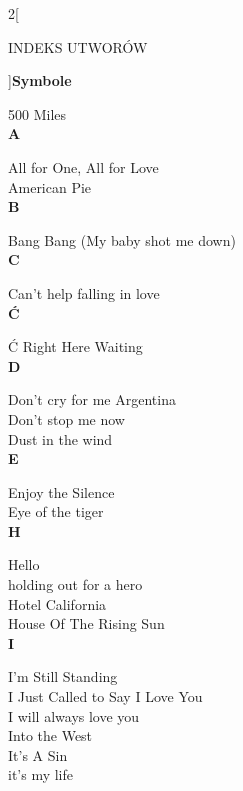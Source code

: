 \documentclass[a4paper]{report}
\begin{document}
\begin{multicols*}{2}[\begin{Huge}INDEKS UTWORÓW\end{Huge}\vspace{1cm}]{\Large\bfseries  Symbole  }\nopagebreak 

500 Miles  \\

\indexspace
{\Large\bfseries  A  }\nopagebreak 

All for One, All for Love  \\
American Pie  \\

\indexspace
{\Large\bfseries  B  }\nopagebreak 

Bang Bang (My baby shot me down)  \\

\indexspace
{\Large\bfseries  C  }\nopagebreak 

Can't help falling in love  \\

\indexspace
{\Large\bfseries  Ć  }\nopagebreak 

Ć Right Here Waiting  \\

\indexspace
{\Large\bfseries  D  }\nopagebreak 

Don't cry for me Argentina  \\
Don't stop me now  \\
Dust in the wind  \\

\indexspace
{\Large\bfseries  E  }\nopagebreak 

Enjoy the Silence  \\
Eye of the tiger  \\

\indexspace
{\Large\bfseries  H  }\nopagebreak 

Hello  \\
holding out for a hero  \\
Hotel California  \\
House Of The Rising Sun  \\

\indexspace
{\Large\bfseries  I  }\nopagebreak 

I'm Still Standing  \\
I Just Called to Say I Love You  \\
I will always love you  \\
Into the West  \\
It's A Sin  \\
it's my life  \\


\end{multicols*}
\end{document}
